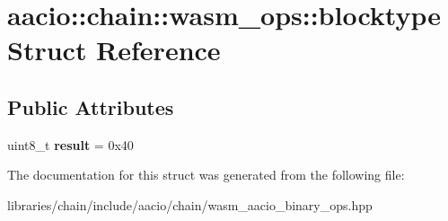 \hypertarget{structaacio_1_1chain_1_1wasm__ops_1_1blocktype}{}\section{aacio\+:\+:chain\+:\+:wasm\+\_\+ops\+:\+:blocktype Struct Reference}
\label{structaacio_1_1chain_1_1wasm__ops_1_1blocktype}
\subsection*{Public Attributes}
\begin{DoxyCompactItemize}
\item 
\mbox{\label{structaacio_1_1chain_1_1wasm__ops_1_1blocktype_ace40ee9cff5a4c5fa840068250e8ac4e}} 
uint8\+\_\+t {\bfseries result} = 0x40
\end{DoxyCompactItemize}


The documentation for this struct was generated from the following file\+:\begin{DoxyCompactItemize}
\item 
libraries/chain/include/aacio/chain/wasm\+\_\+aacio\+\_\+binary\+\_\+ops.\+hpp\end{DoxyCompactItemize}
